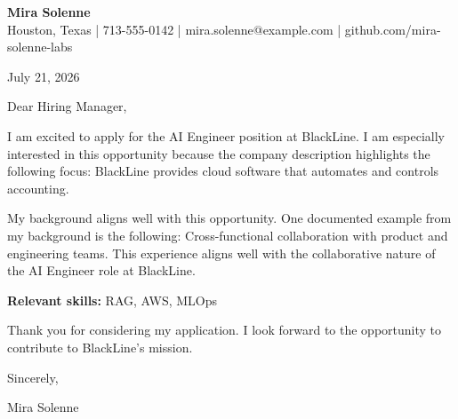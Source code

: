 \documentclass[11pt]{article}
\begin{document}
\begin{center}
{\Large\bfseries Mira Solenne}\\
Houston, Texas | 713-555-0142 | mira.solenne@example.com | github.com/mira-solenne-labs
\end{center}

July 21, 2026

Dear Hiring Manager,

I am excited to apply for the AI Engineer position at BlackLine. I am especially interested in this opportunity because the company description highlights the following focus: BlackLine provides cloud software that automates and controls accounting.

My background aligns well with this opportunity. One documented example from my background is the following: Cross-functional collaboration with product and engineering teams. This experience aligns well with the collaborative nature of the AI Engineer role at BlackLine.

\textbf{Relevant skills:} RAG, AWS, MLOps

Thank you for considering my application. I look forward to the opportunity to contribute to BlackLine's mission.

Sincerely,

Mira Solenne
\end{document}
